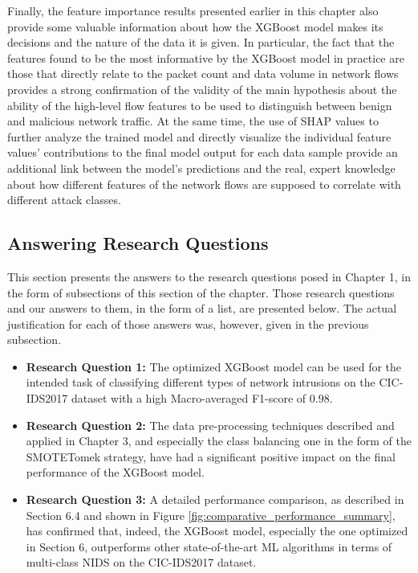 Finally, the feature importance results presented earlier in this chapter also provide some valuable information about how the XGBoost model makes its decisions and the nature of the data it is given. In particular, the fact that the features found to be the most informative by the XGBoost model in practice are those that directly relate to the packet count and data volume in network flows provides a strong confirmation of the validity of the main hypothesis about the ability of the high-level flow features to be used to distinguish between benign and malicious network traffic. At the same time, the use of SHAP values to further analyze the trained model and directly visualize the individual feature values’ contributions to the final model output for each data sample provide an additional link between the model’s predictions and the real, expert knowledge about how different features of the network flows are supposed to correlate with different attack classes.

\subsection{Answering Research Questions}

This section presents the answers to the research questions posed in Chapter 1, in the form of subsections of this section of the chapter. Those research questions and our answers to them, in the form of a list, are presented below. The actual justification for each of those answers was, however, given in the previous subsection.

\begin{itemize}
	\item \textbf{Research Question 1: } The optimized XGBoost model can be used for the intended task of classifying different types of network intrusions on the CIC-IDS2017 dataset with a high Macro-averaged F1-score of $0.98$.
	\item \textbf{Research Question 2: } The data pre-processing techniques described and applied in Chapter 3, and especially the class balancing one in the form of the SMOTETomek strategy, have had a significant positive impact on the final performance of the XGBoost model.
	\item \textbf{Research Question 3: } A detailed performance comparison, as described in Section 6.4 and shown in Figure \ref{fig:comparative_performance_summary}, has confirmed that, indeed, the XGBoost model, especially the one optimized in Section 6, outperforms other state-of-the-art ML algorithms in terms of multi-class NIDS on the CIC-IDS2017 dataset.
\end{itemize}


